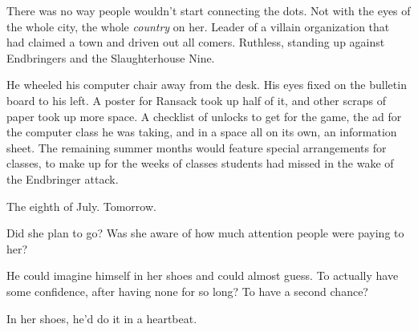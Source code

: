 There was no way people wouldn't start connecting the dots.  Not with the eyes of the whole city, the whole \emph{country} on her.  Leader of a villain organization that had claimed a town and driven out all comers.  Ruthless, standing up against Endbringers and the Slaughterhouse Nine.



He wheeled his computer chair away from the desk.  His eyes fixed on the bulletin board to his left.  A poster for Ransack took up half of it, and other scraps of paper took up more space.  A checklist of unlocks to get for the game, the ad for the computer class he was taking, and in a space all on its own, an information sheet.  The remaining summer months would feature special arrangements for classes, to make up for the weeks of classes students had missed in the wake of the Endbringer attack.



The eighth of July.  Tomorrow.



Did she plan to go?  Was she aware of how much attention people were paying to her?



He could imagine himself in her shoes and could almost guess.  To actually have some confidence, after having none for so long?  To have a second chance?



In her shoes, he'd do it in a heartbeat.





